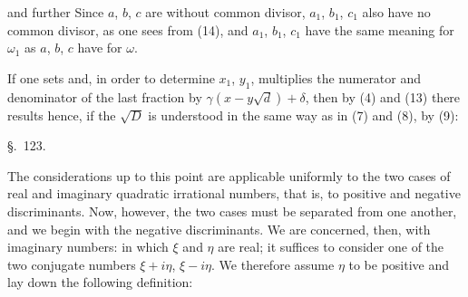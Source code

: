 and further
Since $a$, $b$, $c$ are without common divisor, $a_1$, $b_1$, $c_1$ also have no common divisor, as one sees from (14), and $a_1$, $b_1$, $c_1$ have the same meaning for $\omega_1$ as $a$, $b$, $c$ have for $\omega$.


If one sets
and, in order to determine $x_1$, $y_1$, multiplies the numerator and denominator of the last fraction by $\gamma(x-y\sqrt{d})+\delta$, then by (4) and (13) there results
hence, if the $\sqrt{D}$ is understood in the same way as in (7) and (8), by (9):

\begin{center}
\S.\ 123.

\end{center}

The considerations up to this point are applicable uniformly to the two cases of real and imaginary quadratic irrational numbers, that is, to positive and negative discriminants. Now, however, the two cases must be separated from one another, and we begin with the negative discriminants. We are concerned, then, with imaginary numbers:
in which $\xi$ and $\eta$ are real; it suffices to consider one of the two conjugate numbers $\xi+i\eta$, $\xi-i\eta$. We therefore assume $\eta$ to be positive and lay down the following definition:
